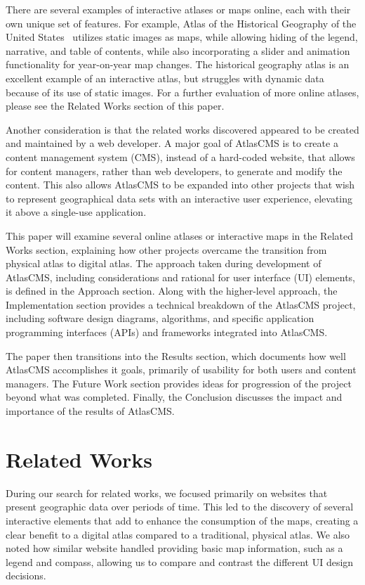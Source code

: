 \documentclass[11pt, draftcls, conference, onecolumn]{IEEEtran}
\begin{document}
There are several examples of interactive atlases or maps online, each with their own unique set of features. For example, Atlas of the Historical Geography of the United States~\cite{us-historical-atlas-2014} utilizes static images as maps, while allowing hiding of the legend, narrative, and table of contents, while also incorporating a slider and animation functionality for year-on-year map changes.  The historical geography atlas is an excellent example of an interactive atlas, but struggles with dynamic data because of its use of static images. For a further evaluation of more online atlases, please see the Related Works section of this paper.

Another consideration is that the related works discovered appeared to be created and maintained by a web developer. A major goal of AtlasCMS is to create a content management system (CMS), instead of a hard-coded website, that allows for content managers, rather than web developers, to generate and modify the content. This also allows AtlasCMS to be expanded into other projects that wish to represent geographical data sets with an interactive user experience, elevating it above a single-use application.

This paper will examine several online atlases or interactive maps in the Related Works section, explaining how other projects overcame the transition from physical atlas to digital atlas. The approach taken during development of AtlasCMS, including considerations and rational for user interface (UI) elements, is defined in the Approach section. Along with the higher-level approach, the Implementation section provides a technical breakdown of the AtlasCMS project, including software design diagrams, algorithms, and specific application programming interfaces (APIs) and frameworks integrated into AtlasCMS.

The paper then transitions into the Results section, which documents how well AtlasCMS accomplishes it goals, primarily of usability for both users and content managers. The Future Work section provides ideas for progression of the project beyond what was completed. Finally, the Conclusion discusses the impact and importance of the results of AtlasCMS.

\section{Related Works}
During our search for related works, we focused primarily on websites that present geographic data over periods of time. This led to the discovery of several interactive elements that add to enhance the consumption of the maps, creating a clear benefit to a digital atlas compared to a traditional, physical atlas. We also noted how similar website handled providing basic map information, such as a legend and compass, allowing us to compare and contrast the different UI design decisions.
\end{document}
